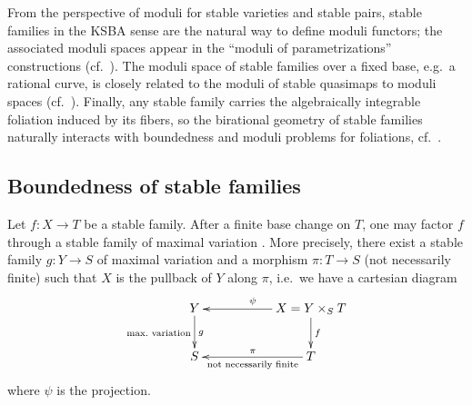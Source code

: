 \documentclass[11pt,reqno]{amsart}
\numberwithin{equation}{section}
\theoremstyle{definition}
\begin{document}
From the perspective of moduli for stable varieties and stable pairs, stable families in the KSBA sense are the natural way to define moduli functors; the associated moduli spaces appear in the ``moduli of parametrizations'' constructions (cf.~\cite{AB19,AB21,Inc20,AB22,AB23}). The moduli space of stable families over a fixed base, e.g.\ a rational curve, is closely related to the moduli of stable quasimaps to moduli spaces (cf.~\cite{DLI24,HH25b,ISZ25,IZ25,Hat26}).
Finally, any stable family carries the algebraically integrable foliation induced by its fibers, so the birational geometry of stable families naturally interacts with boundedness and moduli problems for foliations, cf.~\cite{SS23,SSV25}.

\subsection{Boundedness of stable families}
Let $f\colon X \to T$ be a stable family. After a finite base change on $T$, one may factor $f$ through a stable family of maximal variation \cite[Corollary~6.20]{KP17}. More precisely, there exist a stable family $g\colon Y\to S$ of maximal variation and a morphism $\pi\colon T\to S$ (not necessarily finite) such that $X$ is the pullback of $Y$ along $\pi$, i.e.\ we have a cartesian diagram
\[
\xymatrix{
Y \ar[d]^g_{\text{max.\ variation}} & & X=Y\times_S T \ar[ll]_{\psi} \ar[d]^f \\
S & & T \ar[ll]_{\pi}^{\text{not necessarily finite}}
}
\]
where $\psi$ is the projection.
\end{document}
